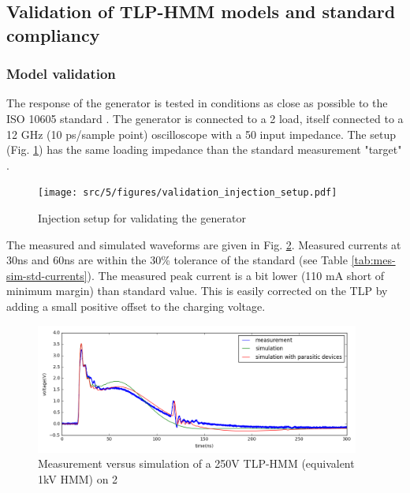 \subsection{Validation of TLP-HMM models and standard compliancy}

\subsubsection{Model validation}

The response of the generator is tested in conditions as close as possible to the ISO 10605 standard \cite{iso10605}.
The generator is connected to a 2\textOmega{} load, itself connected to a 12 GHz (10 ps/sample point) oscilloscope with a 50\textOmega{} input impedance.
The setup (Fig. \ref{fig:injection_setup_validation}) has the same loading impedance than the standard measurement "target" \cite{iso10605, iec61000-4-2}.

\begin{figure}[!h]
  \centering
  \texttt{[image: src/5/figures/validation\_injection\_setup.pdf]}
  \caption{Injection setup for validating the generator}
  \label{fig:injection_setup_validation}
\end{figure}

The measured and simulated waveforms are given in Fig. \ref{fig:tlp_hmm_waveforms}.
Measured currents at 30ns and 60ns are within the 30\% tolerance of the standard (see Table \ref{tab:mes-sim-std-currents}).
The measured peak current is a bit lower (110 mA short of minimum margin) than standard value.
This is easily corrected on the TLP by adding a small positive offset to the charging voltage.

\begin{figure}[!h]
  \centering
  \includegraphics[width=0.95\textwidth]{src/5/figures/tlp_hmm_waveforms.png}
  \caption{Measurement versus simulation of a 250V TLP-HMM (equivalent 1kV HMM) on 2\textOmega{}}
  \label{fig:tlp_hmm_waveforms}
\end{figure}

